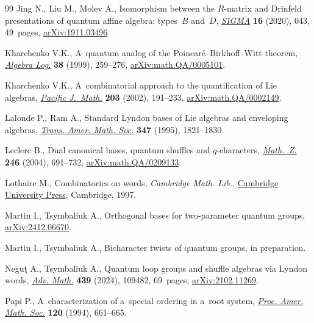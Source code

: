 \documentclass[pdftex]{sigma}
\numberwithin{equation}{section}
\begin{document}
\begin{thebibliography}{99}
Jing N., Liu M., Molev A., Isomorphism between the {$R$}-matrix and {D}rinfeld
 presentations of quantum affine algebra: types~{$B$} and~{$D$},
 \href{https://doi.org/10.3842/SIGMA.2020.043}{\textit{SIGMA}} \textbf{16}
 (2020), 043, 49~pages,
 \href{http://arxiv.org/abs/1911.03496}{arXiv:1911.03496}.

Kharchenko V.K., A~quantum analog of the {P}oincar\'e--{B}irkhoff--{W}itt
 theorem, \href{https://doi.org/10.1007/BF02671731}{\textit{Algebra Log.}}
 \textbf{38} (1999), 259--276,
 \href{http://arxiv.org/abs/math.QA/0005101}{arXiv:math.QA/0005101}.

Kharchenko V.K., A~combinatorial approach to the quantification of {L}ie
 algebras, \href{https://doi.org/10.2140/pjm.2002.203.191}{\textit{Pacific
 J.~Math.}} \textbf{203} (2002), 191--233,
 \href{http://arxiv.org/abs/math.QA/0002149}{arXiv:math.QA/0002149}.

Lalonde P., Ram A., Standard {L}yndon bases of {L}ie algebras and enveloping
 algebras, \href{https://doi.org/10.2307/2154977}{\textit{Trans. Amer. Math.
 Soc.}} \textbf{347} (1995), 1821--1830.

Leclerc B., Dual canonical bases, quantum shuffles and {$q$}-characters,
 \href{https://doi.org/10.1007/s00209-003-0609-9}{\textit{Math.~Z.}}
 \textbf{246} (2004), 691--732,
 \href{http://arxiv.org/abs/math.QA/0209133}{arXiv:math.QA/0209133}.

Lothaire M., Combinatorics on words, \textit{Cambridge Math. Lib.},
 \href{https://doi.org/10.1017/CBO9780511566097}{Cambridge University Press},
 Cambridge, 1997.

Martin I., Tsymbaliuk A., Orthogonal bases for two-parameter quantum groups,
 \href{http://arxiv.org/abs/2412.06670}{arXiv:2412.06670}.

Martin I., Tsymbaliuk A., Bicharacter twists of quantum groups, {i}n
 preparation.

Negu\c{t} A., Tsymbaliuk A., Quantum loop groups and shuffle algebras via
 {L}yndon words, \href{https://doi.org/10.1016/j.aim.2023.109482}{\textit{Adv.
 Math.}} \textbf{439} (2024), 109482, 69~pages,
 \href{http://arxiv.org/abs/2102.11269}{arXiv:2102.11269}.

Papi P., A~characterization of a~special ordering in a~root system,
 \href{https://doi.org/10.2307/2160454}{\textit{Proc. Amer. Math. Soc.}}
 \textbf{120} (1994), 661--665.


\end{thebibliography}
\end{document}
